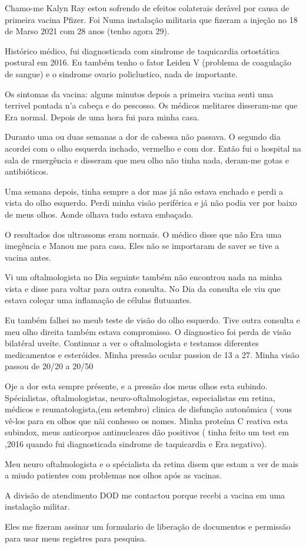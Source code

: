 Chamo-me Kalyn Ray estou sofrendo de efeitos colaterais deràvel por causa de
primeira vacina Pfizer. Foi Numa instalação militaria que fizeram a injeção no
18 de Marso 2021 com 28 anos (tenho agora 29).

Histórico médico, fui diagnosticada com sindrome de taquicardia ortostática
postural em 2016. Eu também tenho o fator Leiden V (problema de coagulação de
sangue) e o sindrome ovario policlustico, nada de importante.

Os sintomas da vacina: alguns minutos depois a primeira vacina senti uma
terrivel pontada n'a cabeça e do pescosso. Os médicos melitares disseram-me que
Era normal. Depois de uma hora fui para minha casa.

Duranto uma ou duas semanas a dor de cabessa não passava. O segundo dia acordei
com o olho esquerda inchado, vermelho e com dor. Então fui o hospital na sala de
rmergência e disseram que meu olho não tinha nada, deram-me gotas e
antibióticos.

Uma semana depois, tinha sempre a dor mas já não estava enchado e perdi a vista
do olho esquerdo. Perdi minha visão periférica e já não podia ver por baixo de
meus olhos. Aonde olhava tudo estava embaçado.

O resultados dos ultrassoms eram normais. O médico disse que não Era uma
imegência e Manou me para casa. Eles não se importaram de saver se tive a vacina
antes.

Vi um oftalmologista no Dia seguinte também não encontrou nada na minha vista e
disse para voltar para outra consulta. No Dia da consulta ele viu que estava
coleçar uma inflamação de células flutuantes.

Eu também falhei no meub teste de visão do olho esquerdo. Tive outra consulta e
meu olho direita também estava compromisso. O diagnostico foi perda de visão
bilatéral uveíte. Continuar a ver o oftalmologista e testamos diferentes
medicamentos e esteróides. Minha pressão ocular passion de 13 a 27. Minha visão
passou de 20/20 a 20/50

Oje a dor esta sempre présente, e a pressão dos meus olhos esta
subindo. Spécialistas, oftalmologistas, neuro-oftalmologistas, especialistas em
retina, médicos e reumatologista,(em setembro) clinica de disfunção autonômica (
vous vê-los para en olhos que nãi conhesso os nomes. Minha proteína C reativa
esta subindox, meus anticorpos antinucleares dão positivos ( tinha feito um test
em ,2016 quando fui diagnosticada sindrome de taquicardia e Era negativo).

Meu neuro oftalmologista e o spécialista da retina disem que estam a ver de mais
a miudo patientes com problemas nos olhos após as vacinas.

A divisão de atendimento DOD me contactou porque recebi a vacina em uma
instalação militar.

Eles me fizeram assinar um formulario de liberação de documentos e permissão
para usar meus registres para pesquisa.
